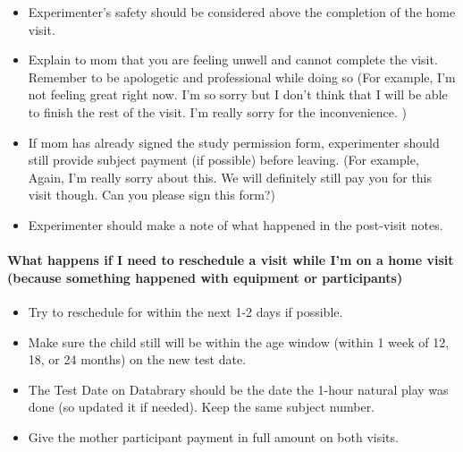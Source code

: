 \documentclass[
]{book}
\providecommand{\tightlist}{%
  \setlength{\itemsep}{0pt}\setlength{\parskip}{0pt}}
\begin{document}
\begin{itemize}
\tightlist
\item
  Experimenter's safety should be considered above the completion of the home visit.\\
\item
  Explain to mom that you are feeling unwell and cannot complete the visit. Remember to be apologetic and professional while doing so (For example, I'm not feeling great right now. I'm so sorry but I don't think that I will be able to finish the rest of the visit. I'm really sorry for the inconvenience. )\\
\item
  If mom has already signed the study permission form, experimenter should still provide subject payment (if possible) before leaving. (For example, Again, I'm really sorry about this. We will definitely still pay you for this visit though. Can you please sign this form?)\\
\item
  Experimenter should make a note of what happened in the post-visit notes.
\end{itemize}

\hypertarget{what-happens-if-i-need-to-reschedule-a-visit-while-im-on-a-home-visit-because-something-happened-with-equipment-or-participants-1}{%
\paragraph*{What happens if I need to reschedule a visit while I'm on a home visit (because something happened with equipment or participants)}\label{what-happens-if-i-need-to-reschedule-a-visit-while-im-on-a-home-visit-because-something-happened-with-equipment-or-participants-1}}

\begin{itemize}
\tightlist
\item
  Try to reschedule for within the next 1-2 days if possible.
\item
  Make sure the child still will be within the age window (within 1 week of 12, 18, or 24 months) on the new test date.
\item
  The Test Date on Databrary should be the date the 1-hour natural play was done (so updated it if needed). Keep the same subject number.
\item
  Give the mother participant payment in full amount on both visits.
\end{itemize}
\end{document}
